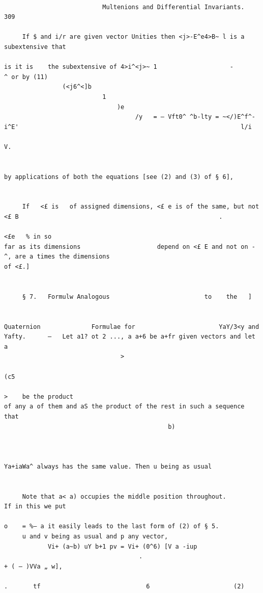 \documentclass[10pt]{article}
\begin{document}
\clearpage
\begin{verbatim}

                           Multenions and Differential Invariants.                                                                                   309

     If $ and i/r are given vector Unities then <j>-E^e4>B~ l is a subextensive that

is it is    the subextensive of 4>i^<j>~ 1                    -        ^ or by (11)
                (<j6^<]b
                           1
                               )e
                                    /y   = — Vft0^ ^b-lty = ~</)E^f^-i^E'                                                             l/i
                                                                                                                                        V.


by applications of both the equations [see (2) and (3) of § 6],


     If   <£ is   of assigned dimensions, <£ e is of the same, but not <£ B                                                       .
                                                                                                                                            <£e   % in so
far as its dimensions                     depend on <£ E and not on -^, are a times the dimensions
of <£.]


     § 7.   Formulw Analogous                          to    the   ]

                                                                       Quaternion              Formulae for                       YaY/3<y and
Yafty.      —   Let a1? ot 2 ..., a a+6 be a+fr given vectors and let a
                                >
                                                                                                                   (c5
                                                                                                                         >    be the product
of any a of them and aS the product of the rest in such a sequence that
                                             b)



Ya+iaWa^ always has the same value. Then u being as usual


     Note that a< a) occupies the middle position throughout.                                                       If in this we put

o    = %— a it easily leads to the last form of (2) of § 5.
     u and v being as usual and p any vector,
            Vi+ (a~b) uY b+1 pv = Vi+ (0^6) [V a -iup
                                     .                                          + ( — )VVa „ w],
                                                                                       .       tf                             6                       (2)


\end{verbatim}
\end{document}
